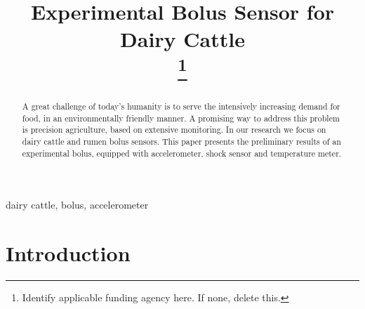 \documentclass[conference]{IEEEtran}
\begin{document}
\title{Experimental Bolus Sensor for Dairy Cattle\\
\thanks{Identify applicable funding agency here. If none, delete this.}
}

\author{
\and
{}
\and
{}
}

\maketitle

\begin{abstract}
A great challenge of today's humanity is to serve the intensively
increasing demand for food, in an environmentally friendly manner.
A promising way to address this problem is precision agriculture,
based on extensive monitoring. In our research we focus on dairy
cattle and rumen bolus sensors. This paper presents the preliminary
results of an experimental bolus, equipped with accelerometer,
shock sensor and temperature meter.
\end{abstract}

\begin{IEEEkeywords}
dairy cattle, bolus, accelerometer
\end{IEEEkeywords}

\section{Introduction}




\end{document}
